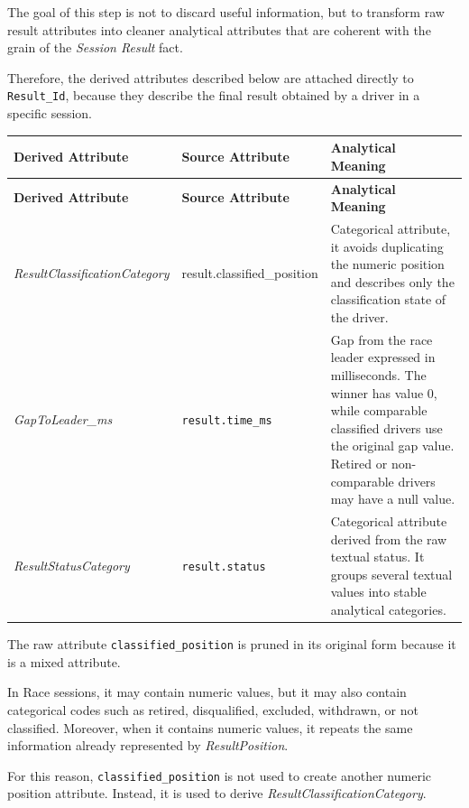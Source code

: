 \documentclass[a4paper,11pt]{article}
\begin{document}
	The goal of this step is not to discard useful information, but to transform raw result
	attributes into cleaner analytical attributes that are coherent with the grain of the
	\textit{Session Result} fact.
	

	Therefore, the derived attributes described below are attached directly to
	\texttt{Result\_Id}, because they describe the final result obtained by a driver in a
	specific session.
	
	\begin{longtable}{|p{4.5cm}|p{4.2cm}|p{6.2cm}|}
		\hline
		\textbf{Derived Attribute} & \textbf{Source Attribute} & \textbf{Analytical Meaning} \\
		\hline
		\endfirsthead
		
		\hline
		\textbf{Derived Attribute} & \textbf{Source Attribute} & \textbf{Analytical Meaning} \\
		\hline
		\endhead
		

		\textit{ResultClassificationCategory}
		& result.classified\_position
		& Categorical attribute, it avoids duplicating the numeric position and describes only the classification state of the driver. \\
		\hline
		
		\textit{GapToLeader\_ms}
		& \texttt{result.time\_ms}
		& Gap from the race leader expressed in milliseconds. The winner has value 0, while comparable classified drivers use the original gap value. Retired or non-comparable drivers may have a null value. \\
		\hline
		
		\textit{ResultStatusCategory}
		& \texttt{result.status}
		& Categorical attribute derived from the raw textual status. It groups several textual values into stable analytical categories. \\
		\hline
	\end{longtable}
	
	
	The raw attribute \texttt{classified\_position} is pruned in its original form because it is
	a mixed attribute.
	
	In Race sessions, it may contain numeric values, but it may also contain categorical
	codes such as retired, disqualified, excluded, withdrawn, or not classified. Moreover, when
	it contains numeric values, it repeats the same information already represented by
	\textit{ResultPosition}.
	
	For this reason, \texttt{classified\_position} is not used to create another numeric
	position attribute. Instead, it is used to derive \textit{ResultClassificationCategory}.
	
\end{document}
